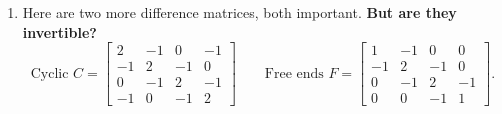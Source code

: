 \documentclass[14pt, a4paper]{article}
\begin{document}
\begin{enumerate}[resume]
    \item Here are two more difference matrices, both important. \textbf{But are they invertible?}
          \[
              \text{Cyclic } C = \begin{bmatrix}
                  2  & -1 & 0  & -1 \\
                  -1 & 2  & -1 & 0  \\
                  0  & -1 & 2  & -1 \\
                  -1 & 0  & -1 & 2
              \end{bmatrix}
              \qquad
              \text{Free ends } F = \begin{bmatrix}
                  1  & -1 & 0  & 0  \\
                  -1 & 2  & -1 & 0  \\
                  0  & -1 & 2  & -1 \\
                  0  & 0  & -1 & 1
              \end{bmatrix}.
          \]


\end{enumerate}
\end{document}
